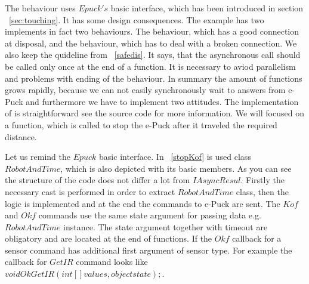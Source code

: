 	The behaviour  uses $Epuck's$ basic interface,	which has been introduced in section ~\ref{sec:touching}.
	It has some design consequences. The example has two implements in fact two behaviours. The behaviour, which has a good connection at disposal,
	and the behaviour, which has to deal with a broken connection.
	We also keep the quideline from ~\ref{safedis}. It says, that the asynchronous call should be called only once at the end of a function.
	It is necessary to aviod parallelism and problems with ending of the behaviour.
	In summary the amount of functions grows rapidly, because we can not easily synchronously wait to answers from e-Puck
	and furthermore we have to implement two attitudes.
	The implementation of is straightforward see the source code for more information.
	We will focused on a function, which is called to stop the e-Puck after it traveled the required distance.

	Let us remind the $Epuck$ basic interface.
	In ~\ref{stopKof} is used class $RobotAndTime$, which is also depicted with its basic members.
	As you can see the structure of the code does not differ a lot from $IAsyncResul$. Firstly the necessary cast is performed in order to 
	extract $RobotAndTime$ class, then the logic is implemented and at the end the commands to e-Puck are sent.
	The $Kof$ and $Okf$ commands use the same state argument for passing data e.g. $RobotAndTime$ instance. The state argument together 
	with timeout are obligatory and are located at the end of functions.
	If the $Okf$ callback for a sensor command has additional first argument of sensor type. For example
	the callback for $GetIR$ command looks like $void OkGetIR(int[] values, object state);$.
	
